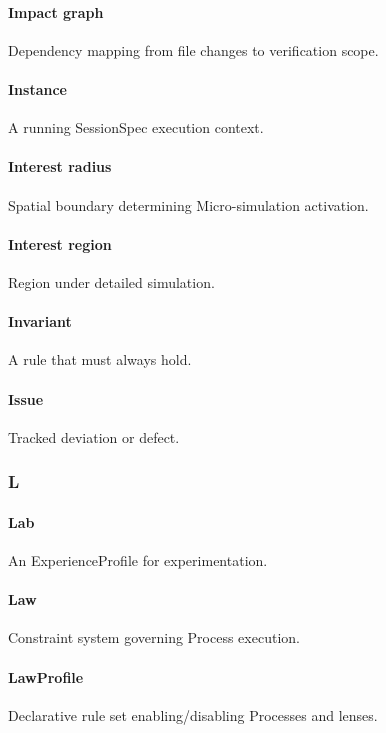 \documentclass[9pt,a4paper,openany]{book}
\begin{document}
\paragraph{Impact graph}
Dependency mapping from file changes to verification scope.\allowbreak{}


\paragraph{Instance}
A running SessionSpec execution context.\allowbreak{}


\paragraph{Interest radius}
Spatial boundary determining Micro-\allowbreak{}simulation activation.\allowbreak{}


\paragraph{Interest region}
Region under detailed simulation.\allowbreak{}


\paragraph{Invariant}
A rule that must always hold.\allowbreak{}


\paragraph{Issue}
Tracked deviation or defect.\allowbreak{}


\subsubsection{L}

\paragraph{Lab}
An ExperienceProfile for experimentation.\allowbreak{}


\paragraph{Law}
Constraint system governing Process execution.\allowbreak{}


\paragraph{LawProfile}
Declarative rule set enabling/\allowbreak{}disabling Processes and lenses.\allowbreak{}
\end{document}
